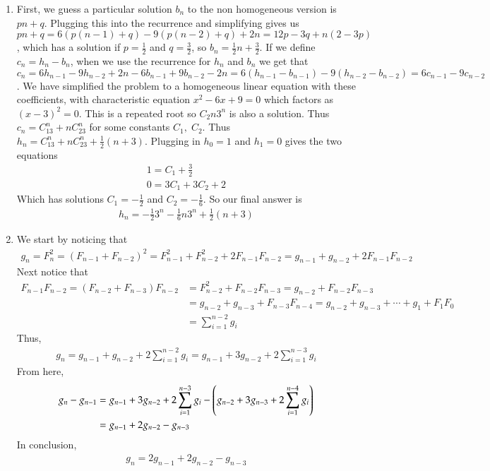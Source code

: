 \documentclass[12pt]{article}
\theoremstyle{definition}
\theoremstyle{remark}
\begin{document}
\begin{enumerate}[leftmargin=\labelsep]
		\item First, we guess a particular solution $b_n$ to the non homogeneous version is $pn+q$. Plugging this into the recurrence and simplifying gives us $pn+q = 6(p(n-1)+q)-9(p(n-2)+q)+2n = 12p-3q + n(2-3p)$, which has a solution if $p = \frac12$ and $q = \frac32$, so $b_n = \frac12 n + \frac32$. If we define $c_n = h_n - b_n$, when we use the recurrence for $h_n$ and $b_n$ we get that $c_n = 6h_{n-1}-9h_{n-2}+2n-6b_{n-1}+9b_{n-2}-2n = 6(h_{n-1}-b_{n-1})-9(h_{n-2}-b_{n-2}) = 6c_{n-1} - 9c_{n-2}$. We have simplified the problem to a homogeneous linear equation with these coefficients, with characteristic equation $x^2-6x+9=0$ which factors as $(x-3)^2=0$. This is a repeated root so $C_2n3^n$ is also a solution. Thus $c_n = C_13^n + nC_23^n$ for some constants $C_1,\;C_2$. Thus $h_n = C_13^n + nC_23^n + \frac12(n+3)$. Plugging in $h_0 = 1$ and $h_1 = 0$ gives the two equations
		\begin{align*}
			1 = C_1 + \frac32 \\
			0 = 3C_1 + 3C_2 + 2
		\end{align*}
		Which has solutions $C_1 = -\frac12$ and $C_2 = -\frac16$. So our final answer is
		\begin{align*}
			h_n = -\frac12 3^n - \frac16 n3^n + \frac12(n+3)
		\end{align*}
	
		\item We start by noticing that 
		\begin{align*}
			g_n = F_n^2 = (F_{n-1}+F_{n-2})^2 = F_{n-1}^2 + F_{n-2}^2 + 2F_{n-1}F_{n-2} = g_{n-1} + g_{n-2} + 2F_{n-1}F_{n-2}
		\end{align*}
		Next notice that 
		\begin{align*}
			F_{n-1}F_{n-2} = (F_{n-2}+F_{n-3})F_{n-2} &= F_{n-2}^2 + F_{n-2}F_{n-3} = g_{n-2} + F_{n-2}F_{n-3} \\
			&= g_{n-2} + g_{n-3} + F_{n-3}F_{n-4} = g_{n-2} + g_{n-3} + \cdots + g_1 + F_1F_0 \\
			&= \sum_{i=1}^{n-2} g_i
		\end{align*}
		Thus, 
		\begin{align*}
			g_n = g_{n-1} + g_{n-2} + 2\sum_{i=1}^{n-2}g_i = g_{n-1} + 3g_{n-2} + 2\sum_{i=1}^{n-3} g_i
		\end{align*}
		From here,
		\begin{align*}
			g_n - g_{n-1} &= g_{n-1} + 3g_{n-2} + 2\sum_{i=1}^{n-3} g_i - \qty(g_{n-2} + 3g_{n-3} + 2\sum_{i=1}^{n-4} g_i) \\
			&= g_{n-1} + 2g_{n-2} - g_{n-3}
		\end{align*}
		In conclusion,
		\begin{align*}
			g_n = 2g_{n-1} + 2g_{n-2} - g_{n-3}
		\end{align*}
	\end{enumerate}
\end{document}
